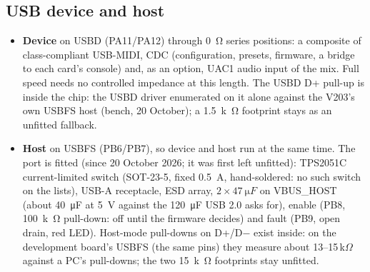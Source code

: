 \documentclass[11pt,a4paper]{article}
\begin{document}
\subsection{USB device and host}
\begin{itemize}
  \item \textbf{Device} on USBD (PA11/PA12) through \SI{0}{\ohm} series positions: a composite of class-compliant
    USB-MIDI, CDC (configuration, presets, firmware, a bridge to each card's console) and, as an option, UAC1 audio
    input of the mix. Full speed needs no controlled impedance at this length. The USBD D+ pull-up is inside the
    chip: the USBD driver enumerated on it alone against the V203's own USBFS host (bench, 20 October); a
    \SI{1.5}{k\ohm} footprint stays as an unfitted fallback.
  \item \textbf{Host} on USBFS (PB6/PB7), so device and host run at the same time. The port is fitted (since 20 October
    2026; it was first left unfitted): TPS2051C current-limited switch (SOT-23-5, fixed \SI{0.5}{A}, hand-soldered: no such
    switch on the lists), USB-A receptacle, ESD array, $2\times\SI{47}{\micro F}$ on VBUS\_HOST (about
    \SI{40}{\micro F} at \SI{5}{V} against the \SI{120}{\micro F} USB 2.0 asks for), enable (PB8, \SI{100}{k\ohm}
    pull-down: off until the firmware decides) and fault (PB9, open drain, red LED). Host-mode pull-downs on D+/D$-$
    exist inside: on the development board's USBFS (the same pins) they measure about 13--15\,k$\Omega$ against a
    PC's pull-downs; the two \SI{15}{k\ohm} footprints stay unfitted.
\end{itemize}
\end{document}
